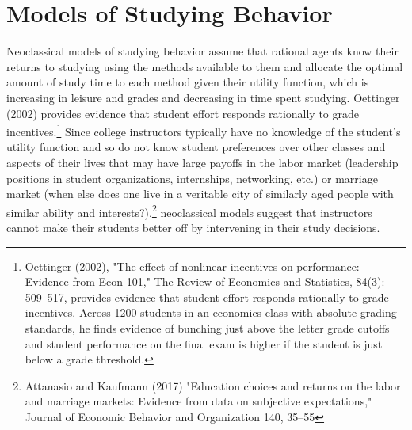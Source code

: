 \documentclass[12pt]{article}
\begin{document}

\section{Models of Studying Behavior}

Neoclassical models of studying behavior assume that rational agents know their returns to studying using the methods available to them and allocate the optimal amount of study time to each method given their utility function, which is increasing in leisure and grades and decreasing in time spent studying.  Oettinger (2002) provides evidence that student effort responds rationally to grade incentives.\footnote{Oettinger (2002), "The effect of nonlinear incentives on performance: Evidence from Econ 101," The Review of Economics and Statistics, 84(3): 509–517, provides evidence that student effort responds rationally to grade incentives.  Across 1200 students in an economics class with absolute grading standards, he finds evidence of bunching just above the letter grade cutoffs and student performance on the final exam is higher if the student is just below a grade threshold.} Since college instructors typically have no knowledge of the student's utility function and so do not know student preferences over other classes and aspects of their lives that may have large payoffs in the labor market (leadership positions in student organizations, internships, networking, etc.) or marriage market (when else does one live in a veritable city of similarly aged people with similar ability and interests?),\footnote{Attanasio and Kaufmann (2017) "Education choices and returns on the labor and marriage markets: Evidence from data on subjective expectations," Journal of Economic Behavior and Organization 140, 35–55} neoclassical models suggest that instructors cannot make their students better off by intervening in their study decisions.
\end{document}
